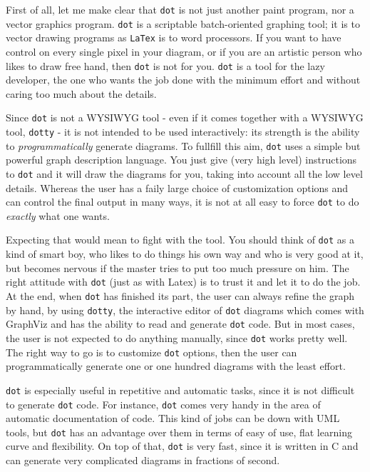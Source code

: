 \documentclass[10pt,english]{article}
\begin{document}
First of all, let me make clear that \texttt{dot} is not just another paint program, 
nor a vector graphics program. \texttt{dot} is a scriptable batch-oriented graphing 
tool;  it is to vector drawing programs as \texttt{LaTex} is to word processors.
If you want to have control on every single pixel in your diagram,
or if you are an artistic person who likes to draw free hand, then \texttt{dot} 
is not for you. \texttt{dot} is a tool for the lazy developer, the one who wants
the job done with the minimum effort and without caring too much about the details.

Since \texttt{dot} is not a WYSIWYG tool - even if it comes together with a WYSIWYG tool, 
\texttt{dotty} - it is not intended to be used interactively: 
its strength is the ability to \emph{programmatically} generate diagrams. To fullfill
this aim, \texttt{dot} uses a simple but powerful graph description language. You 
just give (very high level) instructions to \texttt{dot} and it will draw the diagrams 
for you, taking into account all the low level details. Whereas the user 
has a faily large choice of customization 
options and can control the final output in many ways, it is not at all easy 
to force \texttt{dot} to do \emph{exactly} what one wants.

Expecting that would mean to fight with the tool. 
You should think of \texttt{dot} as a kind of smart boy, 
who likes to do things his own way and who is very good at it, but becomes 
nervous if the master tries to put too much pressure on him. 
The right attitude with \texttt{dot} (just as with Latex) is to trust it and 
let it to do the job.
At the end, when \texttt{dot} has finished its part, the user can always 
refine the graph by hand, by using \texttt{dotty}, the interactive editor 
of \texttt{dot} diagrams which comes with GraphViz and has the ability to read 
and generate \texttt{dot} code.
But in most cases, the user is not expected to do anything manually,
since \texttt{dot} works pretty well. The right way to go is to customize
\texttt{dot} options, then the user can programmatically generate one or
one hundred diagrams with the least effort.

\texttt{dot} is especially useful in repetitive and automatic tasks, since
it is not difficult to generate \texttt{dot} code.
For instance, \texttt{dot} comes very handy in the area of automatic documentation 
of code. This kind of jobs can be down with UML tools, but \texttt{dot} has an 
advantage over them in terms of easy of use, flat learning curve and 
flexibility. On top of that, \texttt{dot} is very fast, since it is written in C
and can generate very complicated diagrams in fractions of second.
\end{document}
